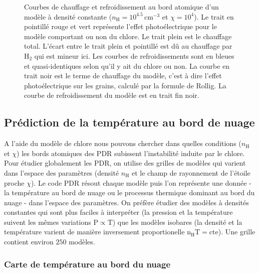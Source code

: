\begin{figure}[!h]
\begin{subfigure}[t]{0.49\textwidth}
    \end{subfigure}
    \caption{Courbes de chauffage et refroidissement au bord atomique d'un modèle à densité constante ($n_\mathrm{H} = 10^{4.5} \,\mathrm{cm}^{-3}$ et $\chi = 10^4$). Le trait en pointillé rouge et vert représente l'effet photoélectrique pour le modèle comportant ou non du chlore.  Le trait plein est le chauffage total. L'écart entre le trait plein et pointillé est dû au chauffage par $\mathrm{H}_2$ qui est mineur ici. Les courbes de refroidissements sont en bleues et quasi-identiques selon qu'il y ait du chlore ou non. La courbe en trait noir est le terme de chauffage du modèle, c'est à dire l'effet photoélectrique sur les grains, calculé par la formule de Rollig. La courbe de refroidissement du modèle est en trait fin noir.}
    
\end{figure}

\subsection{Prédiction de la température au bord de nuage}
 
A l'aide du modèle de chlore nous pouvons chercher dans quelles conditions ($n_\mathrm{H}$ et $\chi$) les bords atomiques des PDR subissent l'instabilité induite par le chlore. Pour étudier globalement les PDR, on utilise des grilles de modèles qui varient dans l'espace des paramètres (densité $n_\mathrm{H}$ et le champ de rayonnement de l'étoile proche $\chi$). Le code PDR résout chaque modèle puis l'on représente une donnée - la température au bord de nuage ou le processus thermique dominant au bord du nuage - dans l'espace des paramètres. On préfère étudier des modèles à densités constantes qui sont plus faciles à interpréter (la pression et la température suivent les mêmes variations $\mathrm{P}\propto \mathrm{T}$) que les modèles isobares (la densité et la température varient de manière inversement proportionelle $\mathrm{n}_\mathrm{H}\mathrm{T}=\mathrm{cte}$). Une grille contient environ $250$ modèles.


\subsubsection{Carte de température au bord du nuage}

